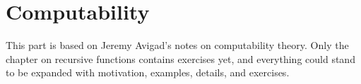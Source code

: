 \documentclass[../../include/open-logic-part]{subfiles}
\begin{document}
\part{Computability}

\begin{editorial}
  This part is based on Jeremy Avigad's notes on computability
  theory. Only the chapter on recursive functions contains exercises
  yet, and everything could stand to be expanded with motivation,
  examples, details, and exercises.
\end{editorial}



\OLEndPartHook
\end{document}
